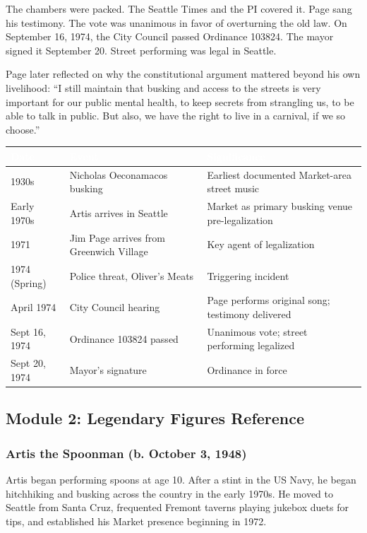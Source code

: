 \documentclass[11pt,letterpaper]{article}
\newcommand{\tableheader}[1]{\textbf{\sffamily\textcolor{white}{#1}}}
\begin{document}
The chambers were packed. The Seattle Times and the PI covered it. Page sang his testimony. The vote was unanimous in favor of overturning the old law. On September 16, 1974, the City Council passed Ordinance 103824. The mayor signed it September 20. Street performing was legal in Seattle.

Page later reflected on why the constitutional argument mattered beyond his own livelihood: ``I still maintain that busking and access to the streets is very important for our public mental health, to keep secrets from strangling us, to be able to talk in public. But also, we have the right to live in a carnival, if we so choose.''

\begin{center}
\begin{tabularx}{\textwidth}{L{3cm}L{3cm}X}
\toprule
{}
\tableheader{Date} & \tableheader{Event} & \tableheader{Significance} \\
\midrule
1930s & Nicholas Oeconamacos busking & Earliest documented Market-area street music \\
Early 1970s & Artis arrives in Seattle & Market as primary busking venue pre-legalization \\
1971 & Jim Page arrives from Greenwich Village & Key agent of legalization \\
1974 (Spring) & Police threat, Oliver's Meats & Triggering incident \\
April 1974 & City Council hearing & Page performs original song; testimony delivered \\
Sept 16, 1974 & Ordinance 103824 passed & Unanimous vote; street performing legalized \\
Sept 20, 1974 & Mayor's signature & Ordinance in force \\
\bottomrule
\end{tabularx}
\end{center}

\subsection{Module 2: Legendary Figures Reference}

\subsubsection{Artis the Spoonman (b. October 3, 1948)}

Artis began performing spoons at age 10. After a stint in the US Navy, he began hitchhiking and busking across the country in the early 1970s. He moved to Seattle from Santa Cruz, frequented Fremont taverns playing jukebox duets for tips, and established his Market presence beginning in 1972.
\end{document}
